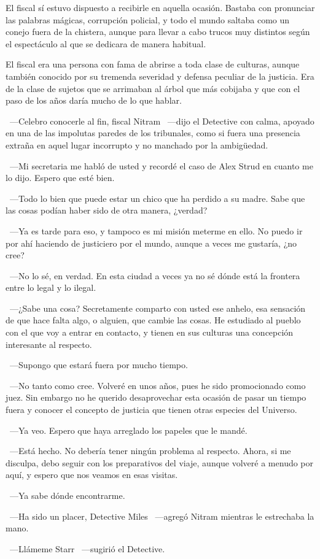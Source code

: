 El fiscal sí estuvo dispuesto a recibirle en aquella ocasión. Bastaba con pronunciar las palabras mágicas, corrupción policial, y todo el mundo saltaba como un conejo fuera de la chistera, aunque para llevar a cabo trucos muy distintos según el espectáculo al que se dedicara de manera habitual.

El fiscal era una persona con fama de abrirse a toda clase de culturas, aunque también conocido por su tremenda severidad y defensa peculiar de la justicia. Era de la clase de sujetos que se arrimaban al árbol que más cobijaba y que con el paso de los años daría mucho de lo que hablar.

~---Celebro conocerle al fin, fiscal Nitram ~---dijo el Detective con calma, apoyado en una de las impolutas paredes de los tribunales, como si fuera una presencia extraña en aquel lugar incorrupto y no manchado por la ambigüedad.

~---Mi secretaria me habló de usted y recordé el caso de Alex Strud en cuanto me lo dijo. Espero que esté bien.

~---Todo lo bien que puede estar un chico que ha perdido a su madre. Sabe que las cosas podían haber sido de otra manera, ¿verdad?

~---Ya es tarde para eso, y tampoco es mi misión meterme en ello. No puedo ir por ahí haciendo de justiciero por el mundo, aunque a veces me gustaría, ¿no cree?

~---No lo sé, en verdad. En esta ciudad a veces ya no sé dónde está la frontera entre lo legal y lo ilegal.

~---¿Sabe una cosa? Secretamente comparto con usted ese anhelo, esa sensación de que hace falta algo, o alguien, que cambie las cosas. He estudiado al pueblo con el que voy a entrar en contacto, y tienen en sus culturas una concepción interesante al respecto.

~---Supongo que estará fuera por mucho tiempo.

~---No tanto como cree. Volveré en unos años, pues he sido promocionado como juez. Sin embargo no he querido desaprovechar esta ocasión de pasar un tiempo fuera y conocer el concepto de justicia que tienen otras especies del Universo.

~---Ya veo. Espero que haya arreglado los papeles que le mandé.

~---Está hecho. No debería tener ningún problema al respecto. Ahora, si me disculpa, debo seguir con los preparativos del viaje, aunque volveré a menudo por aquí, y espero que nos veamos en esas visitas.

~---Ya sabe dónde encontrarme.

~---Ha sido un placer, Detective Miles ~---agregó Nitram mientras le estrechaba la mano.

~---Llámeme Starr ~---sugirió el Detective.
